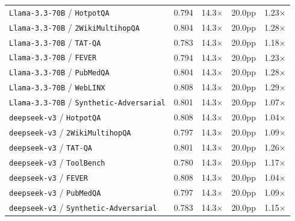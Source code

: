 \begin{longtable}{lcccc}
\texttt{Llama-3.3-70B} / \texttt{HotpotQA} & 0.794 & 14.3$\times$ & 20.0pp & 1.23$\times$ \\
\texttt{Llama-3.3-70B} / \texttt{2WikiMultihopQA} & 0.804 & 14.3$\times$ & 20.0pp & 1.28$\times$ \\
\texttt{Llama-3.3-70B} / \texttt{TAT-QA} & 0.783 & 14.3$\times$ & 20.0pp & 1.18$\times$ \\
\texttt{Llama-3.3-70B} / \texttt{FEVER} & 0.794 & 14.3$\times$ & 20.0pp & 1.23$\times$ \\
\texttt{Llama-3.3-70B} / \texttt{PubMedQA} & 0.804 & 14.3$\times$ & 20.0pp & 1.28$\times$ \\
\texttt{Llama-3.3-70B} / \texttt{WebLINX} & 0.808 & 14.3$\times$ & 20.0pp & 1.29$\times$ \\
\texttt{Llama-3.3-70B} / \texttt{Synthetic-Adversarial} & 0.801 & 14.3$\times$ & 20.0pp & 1.07$\times$ \\
\texttt{deepseek-v3} / \texttt{HotpotQA} & 0.808 & 14.3$\times$ & 20.0pp & 1.04$\times$ \\
\texttt{deepseek-v3} / \texttt{2WikiMultihopQA} & 0.797 & 14.3$\times$ & 20.0pp & 1.09$\times$ \\
\texttt{deepseek-v3} / \texttt{TAT-QA} & 0.801 & 14.3$\times$ & 20.0pp & 1.26$\times$ \\
\texttt{deepseek-v3} / \texttt{ToolBench} & 0.780 & 14.3$\times$ & 20.0pp & 1.17$\times$ \\
\texttt{deepseek-v3} / \texttt{FEVER} & 0.808 & 14.3$\times$ & 20.0pp & 1.04$\times$ \\
\texttt{deepseek-v3} / \texttt{PubMedQA} & 0.797 & 14.3$\times$ & 20.0pp & 1.09$\times$ \\
\texttt{deepseek-v3} / \texttt{Synthetic-Adversarial} & 0.783 & 14.3$\times$ & 20.0pp & 1.15$\times$ \\
\bottomrule
\end{longtable}
